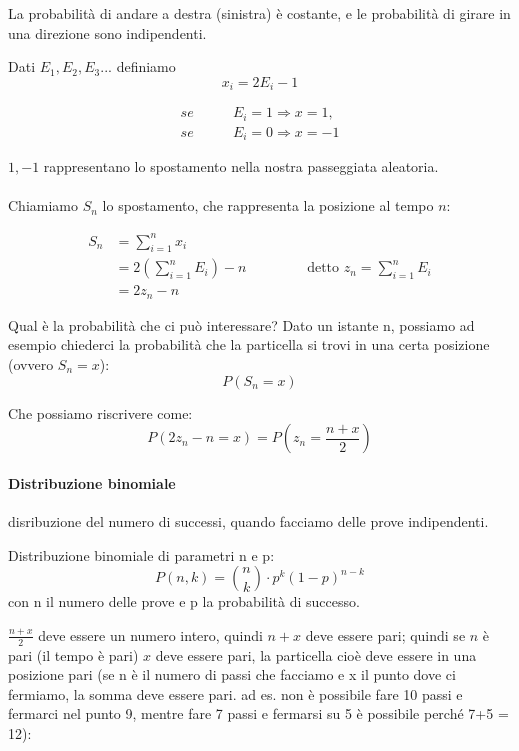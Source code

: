 \documentclass[a4paper,12pt]{book}
\newcommand\ddfrac[2]{\frac{\displaystyle #1}{\displaystyle #2}}
\begin{document}
La probabilità di andare a destra (sinistra) è costante, e le probabilità di girare in una direzione sono indipendenti. 

Dati $ E_1, E_2, E_3... $ definiamo
$$x_i = 2E_i - 1$$

\begin{align*}
	se \qquad & E_i = 1 \Rightarrow x=1, \\
	se \qquad & E_i = 0 \Rightarrow x=-1
\end{align*}

$ 1, -1 $ rappresentano lo spostamento nella nostra passeggiata aleatoria. 
\\
\\
Chiamiamo $ S_n $ lo spostamento, che rappresenta la posizione al tempo $ n $:
\begin{center}
\begin{align*}
	S_n & = \sum_{i=1}^{n} x_i \\
	& = 2(\sum_{i=1}^{n}E_i)-n \qquad \qquad \text{ detto } z_n = \sum_{i=1}^{n} E_i \\
	& = 2z_n - n
\end{align*}
\end{center}

Qual è la probabilità che ci può interessare? Dato un istante n, possiamo ad esempio chiederci la probabilità che la particella si trovi in una certa posizione (ovvero $ S_n = x $):
$$ P(S_n = x) $$

Che possiamo riscrivere come:
$$ P(2z_n - n = x) = P(z_n = \frac{n+x}{2})$$


\begin{tcolorbox}
	\paragraph{Distribuzione binomiale} disribuzione del numero di successi, quando facciamo delle prove indipendenti. 
	
	Distribuzione binomiale di parametri n e p:
	$$P(n, k) = \binom{n}{k} \cdot p^k(1-p)^{n-k}$$
	con n il numero delle prove e p la probabilità di successo. 
\end{tcolorbox}


$\ddfrac{n+x}{2}$ deve essere un numero intero, quindi $ n+x $ deve essere pari; quindi se $ n $ è pari (il tempo è pari) $ x $ deve essere pari, la particella cioè deve essere in una posizione pari (se n è il numero di passi che facciamo e x il punto dove ci fermiamo, la somma deve essere pari. ad es. non è possibile fare 10 passi e fermarci nel punto 9, mentre fare 7 passi e fermarsi su 5 è possibile perché 7+5 = 12):
\end{document}
